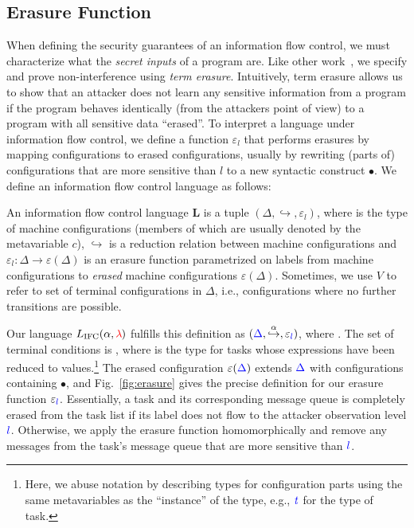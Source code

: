 \documentclass{llncs}
\newcommand{\Varid}[1]{\mathit{#1}}
\newcommand{\Red}[1]{{\color{red} #1}}
\begin{document}
\subsection{Erasure Function}

When defining the security guarantees of an information flow control,
we must characterize what the \emph{secret inputs} of a program are.  Like
other work~\cite{Li+:2010:arrows,Russo+:Haskell08,lio,stefan:addressing-covert},
we specify and prove non-interference using \emph{term erasure}.
Intuitively, term erasure allows us to show that an attacker does not learn
any sensitive information from a program if the program behaves identically
(from the attackers point of view) to a program with all sensitive data
``erased''.
To interpret a language under information flow control, we define a function \ensuremath{\varepsilon_{l}} that
performs erasures by mapping configurations to erased configurations,
usually by rewriting (parts of) configurations that are more sensitive
than \ensuremath{l} to a new syntactic construct \ensuremath{\bullet}.  We define
an information flow control language as follows:

\begin{definition}
    An information flow control language \ensuremath{\textbf{L}} is a tuple \ensuremath{(\Delta,\hookrightarrow,\varepsilon_{l})}, where  is the type of machine configurations (members
    of which are usually denoted by the metavariable \ensuremath{c}), \ensuremath{\hookrightarrow} is a
    reduction relation between machine configurations and \ensuremath{\varepsilon_{l}\mathbin{:}\Delta\rightarrow\varepsilon(\Delta)}
    is an erasure function parametrized on labels from machine configurations to \emph{erased} machine
    configurations \ensuremath{\varepsilon(\Delta)}.  Sometimes, we use \ensuremath{V} to refer to set of
     terminal configurations in \ensuremath{\Delta}, i.e., configurations where
     no further transitions are possible.
\end{definition}

Our language \ensuremath{L_\text{IFC}(\alpha,\Red{\lambda}\;\!\!)} fulfills
this definition as \ensuremath{(\ifc{\Delta},\overset{\alpha}{\hookrightarrow},\varepsilon_{\ifc{l}})}, where
.  The set of terminal conditions
 is , where  is the
type for tasks whose expressions have been reduced to
values.\footnote{
  Here, we abuse notation by describing types for configuration parts using the
  same metavariables as the ``instance'' of the type, e.g., \ensuremath{\ifc{\Varid{t}}} for the type of
  task.
}
The erased configuration \ensuremath{\varepsilon(\ifc{\Delta})} extends \ensuremath{\ifc{\Delta}} with configurations
containing \ensuremath{\bullet}, and Fig.~\ref{fig:erasure} gives the precise definition for
our erasure function \ensuremath{\varepsilon_{\ifc{l}}}.
Essentially, a task and its corresponding message queue is completely erased from the task
list if its label does not flow to the attacker observation level \ensuremath{\ifc{l}}.
Otherwise, we apply the erasure function homomorphically and remove any messages
from the task's message queue that are more sensitive than \ensuremath{\ifc{l}}.
\end{document}
